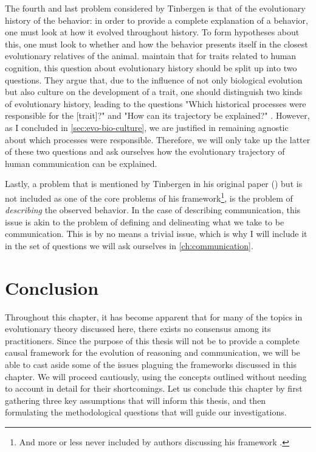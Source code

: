 The fourth and last problem considered by Tinbergen is that of the evolutionary history of the behavior: in order to provide a complete explanation of a behavior, one must look at how it evolved throughout history. To form hypotheses about this, one must look to whether and how the behavior presents itself in the closest evolutionary relatives of the animal.
\citet{BatesonLaland13} maintain that for traits related to human cognition, this question about evolutionary history should be split up into two questions. They argue that, due to the influence of not only biological evolution but also culture on the development of a trait, one should distinguish two kinds of evolutionary history, leading to the questions "Which historical processes were responsible for the [trait]?" and "How can its trajectory be explained?" \citep[p.~714]{BatesonLaland13}. However, as I concluded in \cref{sec:evo-bio-culture}, we are justified in remaining agnostic about which processes were responsible. Therefore, we will only take up the latter of these two questions and ask ourselves how the evolutionary trajectory of human communication can be explained.

Lastly, a problem that is mentioned by Tinbergen in his original paper (\citeyear{Tinbergen63}) but is not included as one of the core problems of his framework\footnote{And more or less never included by authors discussing his framework \citep{LB02, Laland13, AllenBekoff95}.}, is the problem of \emph{describing} the observed behavior.
In the case of describing communication, this issue is akin to the problem of defining and delineating what we take to be communication. This is by no means a trivial issue, which is why I will include it in the set of questions we will ask ourselves in \cref{ch:communication}.

\section{Conclusion}
\label{sec:evo-conclusion}
Throughout this chapter, it has become apparent that for many of the topics in evolutionary theory discussed here, there exists no consensus among its practitioners. Since the purpose of this thesis will not be to provide a complete causal framework for the evolution of reasoning and communication, we will be able to cast aside some of the issues plaguing the frameworks discussed in this chapter. We will proceed cautiously, using the concepts outlined without needing to account in detail for their shortcomings.
Let us conclude this chapter by first gathering three key assumptions that will inform this thesis, and then formulating the methodological questions that will guide our investigations.

